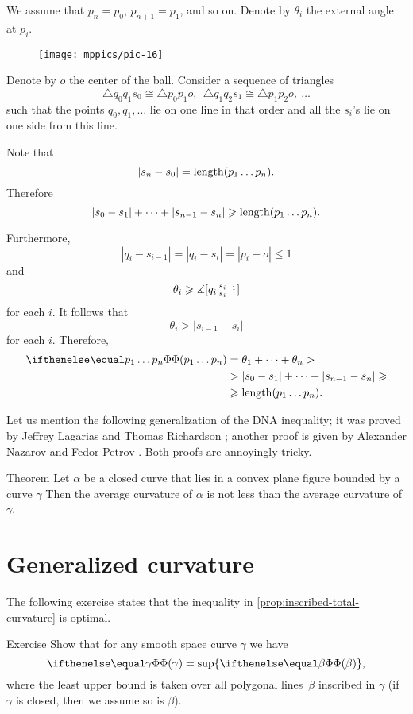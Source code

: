 We assume that $p_n=p_0$, $p_{n+1}=p_1$, and so on.
Denote by $\theta_i$ the external angle at $p_i$.

\begin{figure}[ht!]
\vskip-0mm
\centering
\texttt{[image: mppics/pic-16]}
\vskip0mm
\end{figure}

Denote by $o$ the center of the ball.
Consider a sequence of triangles 
\[\triangle q_0q_1s_0\cong \triangle p_0p_1o,\ \ \triangle q_1q_2s_1\cong \triangle p_1p_2o,\ \dots\]
such that the points $q_0,q_1,\dots$ lie on one line in that order and all the $s_i$'s lie on one side from this line.

Note that 
\[|s_n-s_0|=\mathop{\rm length}\nolimits (p_1\dots p_n).\]
Therefore 
\[|s_0-s_1|+\dots+|s_{n-1}-s_n|\geqslant \mathop{\rm length}\nolimits (p_1\dots p_n).\]

Furthermore,
\[|q_i-s_{i-1}|=|q_i-s_i|=|p_i-o|\le 1\]
and
\[\theta_i\geqslant\measuredangle [q_i\,{}^{s_{i-1}}_{s_i}]\]
for each $i$.
It follows that
\[\theta_i>|s_{i-1}-s_i|\]
for each $i$.
Therefore,
\begin{align*}
\tc {p_1\dots p_n}
&=\theta_1+\dots+\theta_n>
\\
&> |s_{0}-s_1|+\dots +|s_{n-1}-s_n|\ge 
\\
&\ge\length (p_1\dots p_n).
\end{align*}
\qedsf

Let us mention the following  generalization of the DNA inequality;
it was proved by Jeffrey Lagarias and Thomas Richardson \cite{lagarias-richardso}; another proof is given by Alexander Nazarov and Fedor Petrov \cite{nazarov-petrov}.
Both proofs are annoyingly tricky.

\begin{thm}{Theorem}
Let $\alpha$ be a closed curve that lies in a convex plane figure bounded by a curve $\gamma$
Then the average curvature of $\alpha$ is not less than the average curvature of $\gamma$.

\end{thm}

\section{Generalized curvature}

The following exercise states that the inequality in \ref{prop:inscribed-total-curvature} is optimal.

\begin{thm}{Exercise}\label{ex:total-curvature=}
Show that for any smooth space curve $\gamma$ we have 
\[\tc\gamma=\sup\{\tc\beta\},\]
where the least upper bound is taken over all polygonal lines~$\beta$ inscribed in $\gamma$
(if $\gamma$ is closed, then we assume so is $\beta$).
\end{thm}

